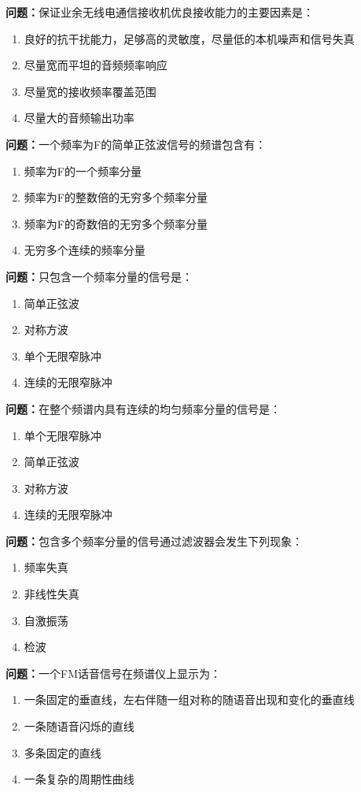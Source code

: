 \documentclass[UTF8]{ctexbook}
\begin{document}
\textbf{问题：}保证业余无线电通信接收机优良接收能力的主要因素是：
\begin{enumerate}[label=\Alph*), leftmargin=3em]
  \item 良好的抗干扰能力，足够高的灵敏度，尽量低的本机噪声和信号失真
  \item 尽量宽而平坦的音频频率响应
  \item 尽量宽的接收频率覆盖范围
  \item 尽量大的音频输出功率
\end{enumerate}

\textbf{问题：}一个频率为F的简单正弦波信号的频谱包含有：
\begin{enumerate}[label=\Alph*), leftmargin=3em]
  \item 频率为F的一个频率分量
  \item 频率为F的整数倍的无穷多个频率分量
  \item 频率为F的奇数倍的无穷多个频率分量
  \item 无穷多个连续的频率分量
\end{enumerate}

\textbf{问题：}只包含一个频率分量的信号是：
\begin{enumerate}[label=\Alph*), leftmargin=3em]
  \item 简单正弦波
  \item 对称方波
  \item 单个无限窄脉冲
  \item 连续的无限窄脉冲
\end{enumerate}

\textbf{问题：}在整个频谱内具有连续的均匀频率分量的信号是：
\begin{enumerate}[label=\Alph*), leftmargin=3em]
  \item 单个无限窄脉冲
  \item 简单正弦波
  \item 对称方波
  \item 连续的无限窄脉冲
\end{enumerate}

\textbf{问题：}包含多个频率分量的信号通过滤波器会发生下列现象：
\begin{enumerate}[label=\Alph*), leftmargin=3em]
  \item 频率失真
  \item 非线性失真
  \item 自激振荡
  \item 检波
\end{enumerate}

\textbf{问题：}一个FM话音信号在频谱仪上显示为：
\begin{enumerate}[label=\Alph*), leftmargin=3em]
  \item 一条固定的垂直线，左右伴随一组对称的随语音出现和变化的垂直线
  \item 一条随语音闪烁的直线
  \item 多条固定的直线
  \item 一条复杂的周期性曲线
\end{enumerate}
\end{document}
